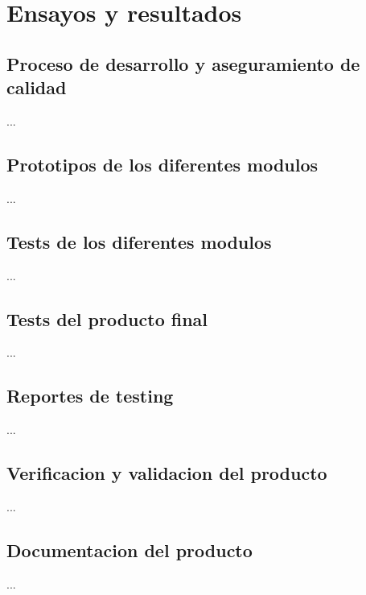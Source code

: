 
\chapter{Ensayos y resultados} %

\label{Chapter4} %


\section{Proceso de desarrollo y aseguramiento de calidad}
\label{sec:pruebasHW}

...

\section{Prototipos de los diferentes modulos}
\label{sec:pruebasHW}

...

\section{Tests de los diferentes modulos}
\label{sec:pruebasHW}

...

\section{Tests del producto final}
\label{sec:pruebasHW}

...

\section{Reportes de testing}
\label{sec:pruebasHW}

...

\section{Verificacion y validacion del producto}
\label{sec:pruebasHW}

...

\section{Documentacion del producto }
\label{sec:pruebasHW}

...



